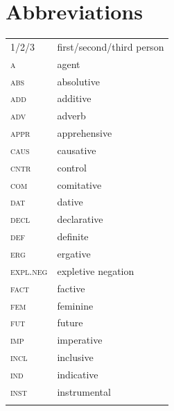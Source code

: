 \documentclass[output=paper,colorlinks,citecolor=brown
]{langscibook}
\begin{document}
\section*{Abbreviations}
\begin{tabularx}{.5\textwidth}{@{}lQ@{}}
1/2/3 & first/second/third person \\
\textsc{a} & agent \\
\textsc{abs} & absolutive \\
\textsc{add} & additive \\
\textsc{adv} & adverb \\
\textsc{appr} & apprehensive \\
\textsc{caus} & causative \\
\textsc{cntr} & control \\
\textsc{com} & comitative \\
\textsc{dat} & dative \\
\textsc{decl} & declarative \\
\textsc{def} & definite \\
\textsc{erg} & ergative \\
\textsc{expl.neg} & expletive negation \\
\textsc{fact} & factive \\
\textsc{fem} & feminine \\
\textsc{fut} & future \\
\textsc{imp} & imperative \\
\textsc{incl} & inclusive \\
\textsc{ind} & indicative \\
\textsc{inst} & instrumental \\\\
\end{tabularx}%
\end{document}
